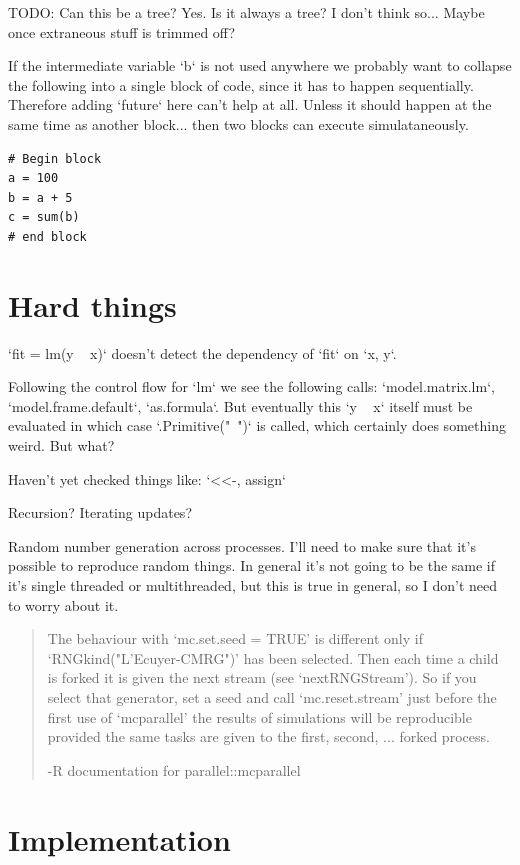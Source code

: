 \documentclass[12pt]{article}
\begin{document}
TODO:
Can this be a tree? Yes. Is it always a tree? I don't think so... Maybe
once extraneous stuff is trimmed off?

If the intermediate variable `b` is not used anywhere we probably want to
collapse the following into a single block of code, since it has to happen
sequentially. Therefore adding `future` here can't help at all. Unless it
should happen at the same time as another block... then two blocks can
execute simulataneously.

\begin{verbatim}
# Begin block
a = 100
b = a + 5
c = sum(b)
# end block
\end{verbatim}

\section{Hard things}

`fit = lm(y ~ x)` doesn't detect the dependency of `fit` on `x, y`.

Following the control flow for `lm` we see the following calls:
`model.matrix.lm`, `model.frame.default`, `as.formula`. But eventually this
`y ~ x` itself must be evaluated in which case `.Primitive("~")` is called,
which certainly does something weird. But what?

Haven't yet checked things like:
`<<-, assign`

Recursion? Iterating updates?

Random number generation across processes. I'll need to make sure that it's
possible to reproduce random things. In general it's not going to be the
same if it's single threaded or multithreaded, but this is true in general,
so I don't need to worry about it.

\begin{quote}
     The behaviour with ‘mc.set.seed = TRUE’ is different only if
     ‘RNGkind("L'Ecuyer-CMRG")’ has been selected.  Then each time a child
     is forked it is given the next stream (see ‘nextRNGStream’).  So if
     you select that generator, set a seed and call ‘mc.reset.stream’ just
     before the first use of ‘mcparallel’ the results of simulations will
     be reproducible provided the same tasks are given to the first,
     second, ...  forked process.

     -R documentation for parallel::mcparallel
\end{quote}

\section{Implementation}
\end{document}
